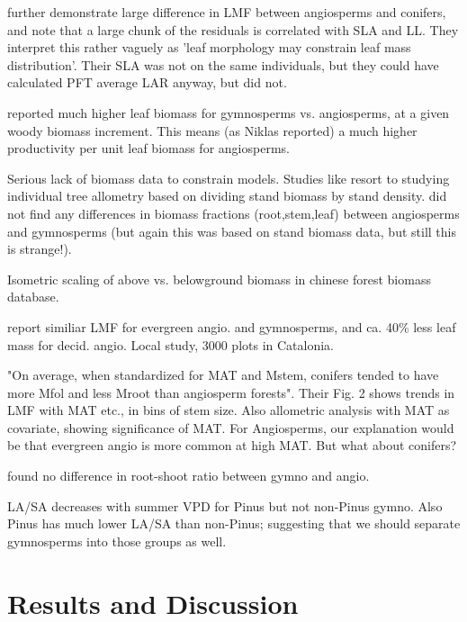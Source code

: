 \documentclass[a4paper]{article}
\begin{document}
\cite{mccarthy_consistency_2007} further demonstrate large difference in LMF between angiosperms and conifers, and note that a large chunk of the residuals is correlated with SLA and LL. They interpret this rather vaguely as 'leaf morphology may constrain leaf mass distribution'. Their SLA was not on the same individuals, but they could have calculated PFT average LAR anyway, but did not.

\cite{oneill_comparative_1981} reported much higher leaf biomass for gymnosperms vs. angiosperms, at a given woody biomass increment. This means (as Niklas reported) a much higher productivity per unit leaf biomass for angiosperms.

Serious lack of biomass data to constrain models. Studies like \cite{wolf_forest_2011} resort to studying individual tree allometry based on dividing stand biomass by stand density. \cite{wolf_allometric_2010} did not find any differences in biomass fractions (root,stem,leaf) between angiosperms and gymnosperms (but again this was based on stand biomass data, but still this is strange!).

\cite{hui_near_2014} Isometric scaling of above vs. belowground biomass in chinese forest biomass database.

\cite{sardans_tree_2013} report similiar LMF for evergreen angio. and gymnosperms, and ca. 40\% less leaf mass for decid. angio. Local study, 3000 plots in Catalonia.

\cite{reich_temperature_2014} "On average, when standardized for MAT and Mstem, conifers tended to have more Mfol and less Mroot than angiosperm forests". Their Fig. 2 shows trends in LMF with MAT etc., in bins of stem size. Also allometric analysis with MAT as covariate, showing significance of MAT. For Angiosperms, our explanation would be that evergreen angio is more common at high MAT. But what about conifers?

\cite{cairns_root_1997} found no difference in root-shoot ratio between gymno and angio.

\cite{delucia_climate-driven_2000} LA/SA decreases with summer VPD for Pinus but not non-Pinus gymno. Also Pinus has much lower LA/SA than non-Pinus; suggesting that we should separate gymnosperms into those groups as well.

\section{Results and Discussion}
\end{document}
